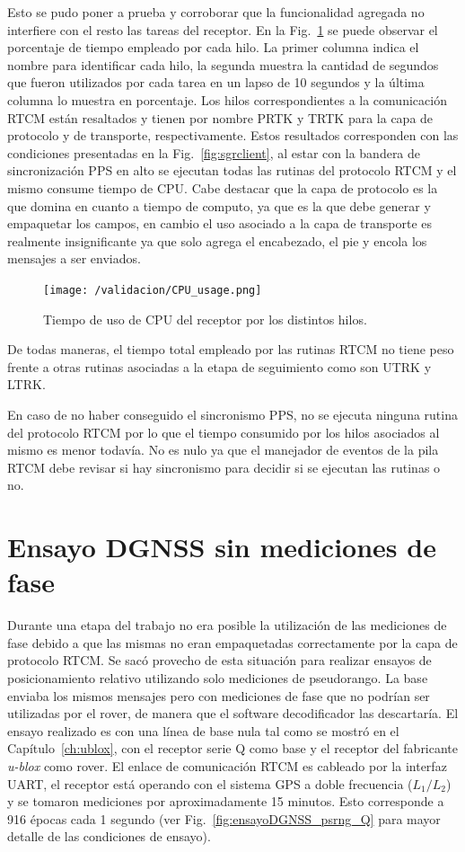 \documentclass[a4paper,12pt,oneside,onecolumn,final,openright]{book}%
\begin{document}
	Esto se pudo poner a prueba y corroborar que la funcionalidad agregada no interfiere con el resto las tareas del receptor. En la Fig.~\ref{fig:CPU_usage} se puede observar el porcentaje de tiempo empleado por cada hilo. La primer columna indica el nombre para identificar cada hilo, la segunda muestra la cantidad de segundos que fueron utilizados por cada tarea en un lapso de 10 segundos y la última columna lo muestra en porcentaje. Los hilos correspondientes a la comunicación RTCM están resaltados y tienen por nombre PRTK y TRTK para la capa de protocolo y de transporte, respectivamente. Estos resultados corresponden con las condiciones presentadas en la Fig.~\ref{fig:sgrclient}, al estar con la bandera de sincronización PPS en alto se ejecutan todas las rutinas del protocolo RTCM y el mismo consume tiempo de CPU. Cabe destacar que la capa de protocolo es la que domina en cuanto a tiempo de computo, ya que es la que debe generar y empaquetar los campos, en cambio el uso asociado a la capa de transporte es realmente insignificante ya que solo agrega el encabezado, el pie y encola los mensajes a ser enviados. 
\begin{figure}
    \centering
	\texttt{[image: /validacion/CPU\_usage.png]}
    \caption{Tiempo de uso de CPU del receptor por los distintos hilos.}
    \label{fig:CPU_usage}
\end{figure}
	De todas maneras, el tiempo total empleado por las rutinas RTCM no tiene peso frente a otras rutinas asociadas a la etapa de seguimiento como son UTRK y LTRK.
	
	En caso de no haber conseguido el sincronismo PPS, no se ejecuta ninguna rutina del protocolo RTCM por lo que el tiempo consumido por los hilos asociados al mismo es menor todavía. No es nulo ya que el manejador de eventos de la pila RTCM debe revisar si hay sincronismo para decidir si se ejecutan las rutinas o no.
\section{Ensayo DGNSS sin mediciones de fase}
	Durante una etapa del trabajo no era posible la utilización de las mediciones de fase debido a que las mismas no eran empaquetadas correctamente por la capa de protocolo RTCM. Se sacó provecho de esta situación para realizar ensayos de posicionamiento relativo utilizando solo mediciones de pseudorango. La base enviaba los mismos mensajes pero con mediciones de fase que no podrían ser utilizadas por el rover, de manera que el software decodificador las descartaría. El ensayo realizado es con una línea de base nula tal como se mostró en el Capítulo~\ref{ch:ublox}, con el receptor serie Q como base y el receptor del fabricante \textit{u-blox} como rover. El enlace de comunicación RTCM es cableado por la interfaz UART, el receptor está operando con el sistema GPS a doble frecuencia ($L_1/L_2$) y se tomaron mediciones por aproximadamente 15 minutos. Esto corresponde a 916 épocas cada 1 segundo (ver Fig.~\ref{fig:ensayoDGNSS_psrng_Q} para mayor detalle de las condiciones de ensayo).
	
\end{document}
